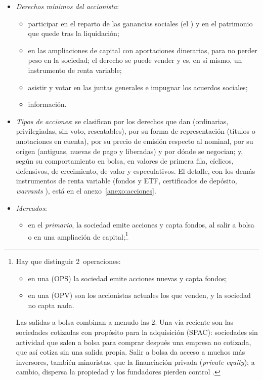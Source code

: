 \documentclass[11pt]{article}
\begin{document}
\begin{itemize}
\item \emph{Derechos mínimos del accionista}\nocite{LSC2010}:
  \begin{itemize}
  \item participar en el reparto de las ganancias sociales (el ) y en el patrimonio que quede tras la liquidación;
  \item {} en las ampliaciones de capital con aportaciones dinerarias, para no perder peso en la sociedad; el derecho se puede vender y es, en sí mismo, un instrumento de renta variable;
  \item asistir y votar en las juntas generales e impugnar los acuerdos sociales;
  \item información.
  \end{itemize}
\item \emph{Tipos de acciones}: se clasifican por los derechos que dan (ordinarias, privilegiadas, sin voto, rescatables), por su forma de representación (títulos o anotaciones en cuenta), por su precio de emisión respecto al nominal, por su origen (antiguas, nuevas de pago y liberadas) y por dónde se negocian; y, según su comportamiento en bolsa, en valores de primera fila, cíclicos, defensivos, de crecimiento, de valor y especulativos. El detalle, con los demás instrumentos de renta variable (fondos y ETF, certificados de depósito, \emph{warrants} ), está en el anexo~\ref{anexo:acciones}.
\item \emph{Mercados}:
  \begin{itemize}
  \item en el \emph{primario}, la sociedad emite acciones y capta fondos, al salir a bolsa o en una ampliación de capital;\footnote{Hay que distinguir 2~operaciones:
\begin{itemize}
\item en una  (OPS) la sociedad emite acciones nuevas y capta fondos;
\item en una  (OPV) son los accionistas actuales los que venden, y la sociedad no capta nada.
\end{itemize}
Las salidas a bolsa combinan a menudo las 2. Una vía reciente son las sociedades cotizadas con propósito para la adquisición (SPAC): sociedades sin actividad que salen a bolsa para comprar después una empresa no cotizada, que así cotiza sin una salida propia. Salir a bolsa da acceso a muchos más inversores, también minoristas, que la financiación privada (\emph{private equity}); a cambio, dispersa la propiedad y los fundadores pierden control .}

\end{itemize}
\end{itemize}
\end{document}
